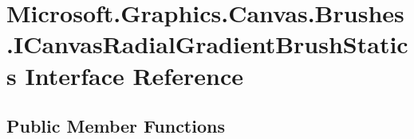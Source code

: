 \hypertarget{interface_microsoft_1_1_graphics_1_1_canvas_1_1_brushes_1_1_i_canvas_radial_gradient_brush_statics}{}\section{Microsoft.\+Graphics.\+Canvas.\+Brushes.\+I\+Canvas\+Radial\+Gradient\+Brush\+Statics Interface Reference}
\label{interface_microsoft_1_1_graphics_1_1_canvas_1_1_brushes_1_1_i_canvas_radial_gradient_brush_statics}
\subsection*{Public Member Functions}
